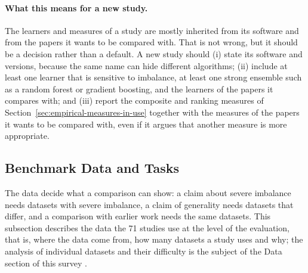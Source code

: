 

\paragraph{What this means for a new study.} The learners and measures of a study are mostly inherited from its software and from the papers it wants to be compared with. That is not wrong, but it should be a decision rather than a default. A new study should (i) state its software and versions, because the same name can hide different algorithms; (ii) include at least one learner that is sensitive to imbalance, at least one strong ensemble such as a random forest or gradient boosting, and the learners of the papers it compares with; and (iii) report the composite and ranking measures of Section~\ref{sec:empirical-measures-in-use} together with the measures of the papers it wants to be compared with, even if it argues that another measure is more appropriate.

\subsection{Benchmark Data and Tasks}
\label{sec:empirical-data}

The data decide what a comparison can show: a claim about severe imbalance needs datasets with severe imbalance, a claim of generality needs datasets that differ, and a comparison with earlier work needs the same datasets. This subsection describes the data the 71 studies use at the level of the evaluation, that is, where the data come from, how many datasets a study uses and why; the analysis of individual datasets and their difficulty is the subject of the Data section of this survey .

